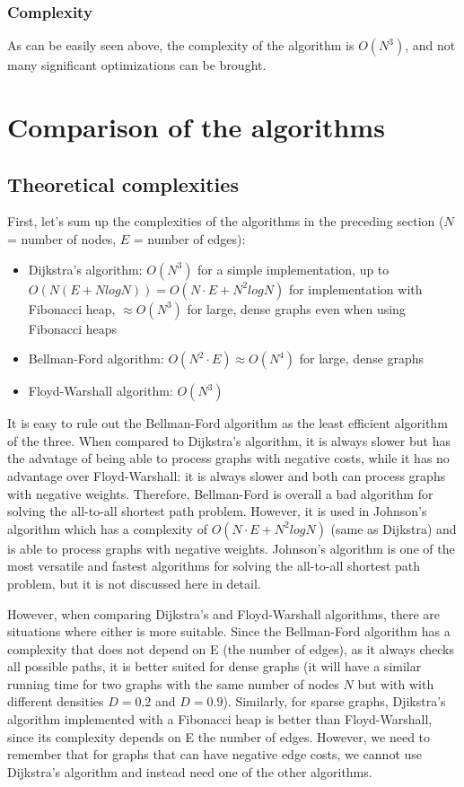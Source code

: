 \documentclass[runningheads]{llncs}
\begin{document}
\subsubsection{Complexity}
As can be easily seen above, the complexity of the algorithm is $O(N^3)$, and not many significant optimizations can be brought.

\section{Comparison of the algorithms}
\subsection{Theoretical complexities}
First, let's sum up the complexities of the algorithms in the preceding section ($N$ = number of nodes, $E$ = number of edges):
\begin{itemize}
	\item Dijkstra's algorithm:  $O(N^3)$ for a simple implementation, up to $O(N(E+NlogN)) = O(N \cdot E + N^2logN)$ for implementation with Fibonacci heap,  $\approx O(N^3)$ for large, dense graphs even when using Fibonacci heaps
	\item Bellman-Ford algorithm: $O(N^2 \cdot E) \approx O(N^4)$ for large, dense graphs
	\item Floyd-Warshall algorithm: $O(N^3)$
\end{itemize}

It is easy to rule out the Bellman-Ford algorithm as the least efficient algorithm of the three. When compared to Dijkstra's algorithm, it is always slower but has the advatage of being able to process graphs with negative costs, while it has no advantage over Floyd-Warshall: it is always slower and both can process graphs with negative weights. Therefore, Bellman-Ford is overall a bad algorithm for solving the all-to-all shortest path problem. However, it is used in Johnson's algorithm which has a complexity of $O(N \cdot E + N^2logN)$ (same as Dijkstra) and is able to process graphs with negative weights. Johnson's algorithm is one of the most versatile and fastest algorithms for solving the all-to-all shortest path problem, but it is not discussed here in detail.

However, when comparing Dijkstra's and Floyd-Warshall algorithms, there are situations where either is more suitable. Since the Bellman-Ford algorithm has a complexity that does not depend on E (the number of edges), as it always checks all possible paths, it is better suited for dense graphs (it will have a similar running time for two graphs with the same number of nodes $N$ but with with different densities $D=0.2$ and $D=0.9$). Similarly, for sparse graphs, Djikstra's algorithm implemented with a Fibonacci heap is better than Floyd-Warshall, since its complexity depends on E the number of edges. However, we need to remember that for graphs that can have negative edge costs, we cannot use Dijkstra's algorithm and instead need one of the other algorithms.
\end{document}
